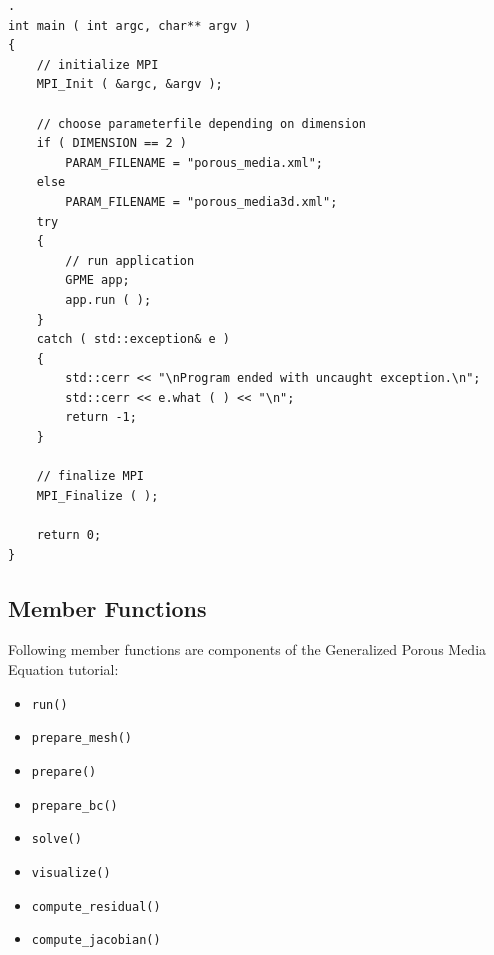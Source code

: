 \documentclass{article}
\begin{document}
\begin{lstlisting}[firstnumber=185]
.
int main ( int argc, char** argv )
{
    // initialize MPI
    MPI_Init ( &argc, &argv );

    // choose parameterfile depending on dimension
    if ( DIMENSION == 2 )
        PARAM_FILENAME = "porous_media.xml";
    else
        PARAM_FILENAME = "porous_media3d.xml";
    try
    {
        // run application
        GPME app;
        app.run ( );
    }
    catch ( std::exception& e )
    {
        std::cerr << "\nProgram ended with uncaught exception.\n";
        std::cerr << e.what ( ) << "\n";
        return -1;
    }

    // finalize MPI
    MPI_Finalize ( );

    return 0;
}
\end{lstlisting}

\subsection{Member Functions}

Following member functions are components of the Generalized Porous Media Equation tutorial:

\begin{itemize}
\item{\texttt{run()}}
\item{\texttt{prepare\_mesh()}}
\item{\texttt{prepare()}}
\item{\texttt{prepare\_bc()}}
\item{\texttt{solve()}}
\item{\texttt{visualize()}}
\item{\texttt{compute\_residual()}}
\item{\texttt{compute\_jacobian()}}
\end{itemize}
\end{document}
